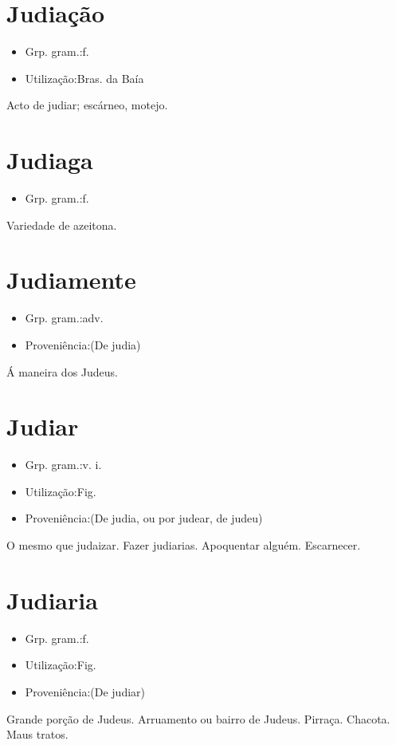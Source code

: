 \documentclass{article}
\begin{document}
\section{Judiação}
\begin{itemize}
\item {Grp. gram.:f.}
\end{itemize}
\begin{itemize}
\item {Utilização:Bras. da Baía}
\end{itemize}
Acto de judiar; escárneo, motejo.
\section{Judiaga}
\begin{itemize}
\item {Grp. gram.:f.}
\end{itemize}
Variedade de azeitona.
\section{Judiamente}
\begin{itemize}
\item {Grp. gram.:adv.}
\end{itemize}
\begin{itemize}
\item {Proveniência:(De \textunderscore judia\textunderscore )}
\end{itemize}
Á maneira dos Judeus.
\section{Judiar}
\begin{itemize}
\item {Grp. gram.:v. i.}
\end{itemize}
\begin{itemize}
\item {Utilização:Fig.}
\end{itemize}
\begin{itemize}
\item {Proveniência:(De \textunderscore judia\textunderscore , ou por \textunderscore judear\textunderscore , de \textunderscore judeu\textunderscore )}
\end{itemize}
O mesmo que \textunderscore judaizar\textunderscore .
Fazer judiarias.
Apoquentar alguém.
Escarnecer.
\section{Judiaria}
\begin{itemize}
\item {Grp. gram.:f.}
\end{itemize}
\begin{itemize}
\item {Utilização:Fig.}
\end{itemize}
\begin{itemize}
\item {Proveniência:(De \textunderscore judiar\textunderscore )}
\end{itemize}
Grande porção de Judeus.
Arruamento ou bairro de Judeus.
Pirraça.
Chacota.
Maus tratos.
\end{document}
